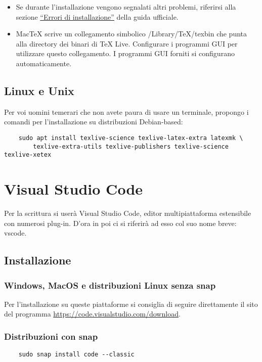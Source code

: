 \documentclass[envcountsame,envcountchap]{svmono}
\begin{document}
\begin{itemize}
    \item Se durante l'installazione vengono segnalati altri problemi, riferirsi alla sezione 
        \href{https://www.tug.org/mactex/mactex-download.html}{“Errori di installazione”} della guida ufficiale.

    \item MacTeX scrive un collegamento simbolico /Library/TeX/texbin che punta 
        alla directory dei binari di TeX Live. Configurare i programmi GUI per utilizzare 
        questo collegamento. I programmi GUI forniti si configurano automaticamente.
    
\end{itemize}


\subsection{Linux e Unix}
Per voi uomini temerari che non avete paura di usare un terminale, 
propongo i comandi per l'installazione su distribuzioni Debian-based:
\begin{verbatim}
    sudo apt install texlive-science texlive-latex-extra latexmk \
        texlive-extra-utils texlive-publishers texlive-science texlive-xetex
\end{verbatim}

\section{Visual Studio Code}
Per la scrittura si userà Visual Studio Code, editor multipiattaforma 
estensibile con numerosi plug-in.
D'ora in poi ci si riferirà ad esso col suo nome breve: vscode.

\subsection{Installazione}
\subsubsection{Windows, MacOS e distribuzioni Linux senza snap}
Per l'installazione su queste piattaforme si consiglia di seguire 
direttamente il sito del programma \url{https://code.visualstudio.com/download}.

\subsubsection{Distribuzioni con snap}
\begin{verbatim}
    sudo snap install code --classic
\end{verbatim}
\end{document}
